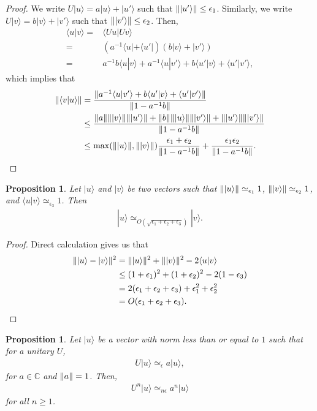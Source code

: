 \documentclass[11pt,letterpaper]{article}
\newcommand{\ket}[1]{|#1\rangle}
\newcommand{\bra}[1]{\langle#1|}
\newcommand{\braket}[2]{\langle#1|#2\rangle}
\DeclarePairedDelimiter{\norm}{\lVert}{\rVert}
\newcommand{\C}{\mathbb{C}}
\newcommand{\1}{\mathbb{1}}
\newcommand{\ep}{\epsilon}
\newcommand{\appd}[1]{\simeq_{#1}}
\newtheorem{proposition}[theorem]{Proposition}
\theoremstyle{definition}
\begin{document}
\begin{proof}
	We write $U\ket{u} = a\ket{u} + \ket{u'}$ such that $\norm{\ket{u'}} \leq \ep_1$.
	Similarly, we write $U\ket{v} = b\ket{v} + \ket{v'}$ such that $\norm{\ket{v'}} \leq \ep_2$.
	Then,
	\begin{align*}
		\braket{u}{v} =& \braket{Uu}{Uv} \\
		=& (a^{-1}\bra{u}+\bra{u'})(b\ket{v}+\ket{v'})\\
		=& a^{-1}b \braket{u}{v} + a^{-1}\braket{u}{v'}
		+ b \braket{u'}{v} + \braket{u'}{v'},
	\end{align*}
	which implies that 
	\begin{align*}
		\norm{\braket{v}{u}} &= \frac{\norm{a^{-1}\braket{u}{v'} +  b\braket{u'}{v}+ \braket{u'}{v'}}}{\norm{1 - a^{-1}b}} \\
		&\leq \frac{\norm{a}\norm{\ket{v}}\norm{\ket{u'}}+
		\norm{b}\norm{\ket{u}}\norm{\ket{v'}} + 
		\norm{\ket{u'}}\norm{\ket{v'}}}{\norm{1 - a^{-1}b}} \\
		&\leq \max(\norm{\ket{u}}, \norm{\ket{v}})\frac{\ep_1+\ep_2}{\norm{1-a^{-1}b}}
		+ \frac{\ep_1\ep_2}{\norm{1-a^{-1}b}}.
	\end{align*}
\end{proof}
\begin{proposition}
\label{prop:close_vec}
	Let $\ket{u}$ and $\ket{v}$ be two vectors such that $\norm{\ket{u}} \appd{\ep_1} 1$,
	$\norm{\ket{v}} \appd{\ep_2} 1$, and $\braket{u}{v} \appd{\ep_3} 1$.
	Then
	\begin{align*}
		\ket{u} \appd{O(\sqrt{\ep_1+\ep_2+\ep_3})} \ket{v}.
	\end{align*}
\end{proposition}
\begin{proof}
	Direct calculation gives us that
	\begin{align*}
		\norm{\ket{u} - \ket{v}}^2 &= \norm{\ket{u}}^2 + \norm{\ket{v}}^2 - 2\braket{u}{v} \\
		&\leq (1+\ep_1)^2 + (1+\ep_2)^2 - 2(1 - \ep_3)\\
		&= 2(\ep_1+\ep_2+\ep_3)+ \ep_1^2 + \ep_2^2\\
		& = O(\ep_1+\ep_2+\ep_3).
	\end{align*}
\end{proof}
\begin{proposition}
	Let $\ket{u}$ be a vector with norm less than or equal to $1$ such that for a unitary $U$,
	\begin{align*}
		U\ket{u} \appd{\ep} a\ket{u},
	\end{align*}
	for $a \in \C$ and $\norm{a} = 1$.
	Then,
	\begin{align*}
		U^n \ket{u} \appd{n\ep} a^n \ket{u}
	\end{align*}
	for all $n \geq 1$.
\end{proposition}
\end{document}

